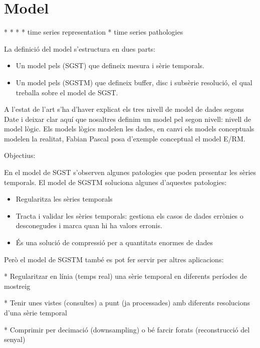 
\section{Model}


* 
* 
* 
* time series representation
* time series pathologies


La definició del model s'estructura en dues parts:

\begin{itemize}
\item Un model pels (SGST)  que defineix mesura i sèrie temporals.
\item Un model pels (SGSTM) que defineix buffer, disc i subsèrie
  resolució, el qual treballa sobre el model de SGST.
\end{itemize}

A l'estat de l'art s'ha d'haver explicat els tres nivell de model de dades segons Date i deixar clar aquí que nosaltres definim un model pel segon nivell: nivell de model lògic. Els models lògics modelen les dades, en canvi els models conceptuals modelen la realitat, Fabian Pascal posa d'exemple conceptual el model E/RM.


Objectius:

En el model de SGST s'observen algunes patologies que poden presentar les sèries temporals. El model de SGSTM soluciona algunes d'aquestes patologies:

\begin{itemize}
\item Regularitza les sèries temporals
\item Tracta i validar les sèries temporals: gestiona els casos de dades errònies o desconegudes i marca quan hi ha valors erronis.
\item És una solució de compressió per a quantitats enormes de dades
\end{itemize}


Però el model de SGSTM també es pot fer servir per altres aplicacions:

* Regularitzar en línia (temps real) una sèrie temporal en diferents períodes de mostreig

* Tenir unes vistes (consultes) a punt (ja processades) amb diferents resolucions d'una sèrie temporal

* Comprimir per decimació (downsampling) o bé farcir forats (reconstrucció del senyal)


